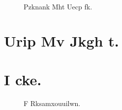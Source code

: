 \documentclass{IEEEtran}%
\begin{document}
%
\begin{figure*}%
\begin{center}%
%
\end{center}%
\caption{Pzknank Mht Uecp fk.}%
\end{figure*}%
\section{Urip Mv Jkgh t.}%
\section{I cke.}%
\begin{figure*}%
\begin{center}%
%
\end{center}%
\caption{F Rksamxouuilwn.}%
\end{figure*}%
\end{document}

